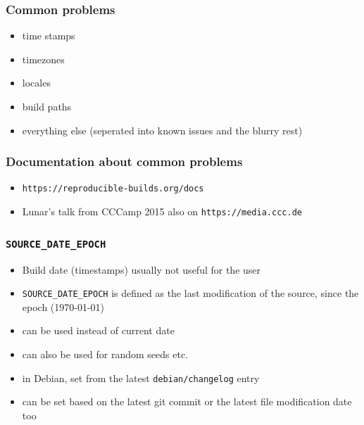\documentclass[14pt]{beamer}
\newif\ifplacelogo
\begin{document}
\placelogofalse

\begin{frame}
 \frametitle{Common problems}

 \begin{itemize}
  \item time stamps
  \item timezones
  \item locales
  \item build paths
  \item everything else (seperated into known issues and the blurry rest)
 \end{itemize}
\end{frame}

\begin{frame}
 \frametitle{Documentation about common problems}
 \begin{itemize}
  \item \texttt{https://reproducible-builds.org/docs}
  \item Lunar's talk from CCCamp 2015 also on
  \texttt{https://media.ccc.de}
 \end{itemize}
\end{frame}


\begin{frame}
 \frametitle{\texttt{SOURCE\_DATE\_EPOCH}}

 \begin{itemize}
  \item Build date (timestamps) usually not useful for the user
  \item \texttt{SOURCE\_DATE\_EPOCH} is defined as the last modification of
  the source, since the epoch (1970-01-01)
  \item can be used instead of current date
  \item can also be used for random seeds etc.
  \item in Debian, set from the latest \texttt{debian/changelog} entry
  \item can be set based on the latest git commit or the latest file
  modification date too
 \end{itemize}
\end{frame}
\end{document}
